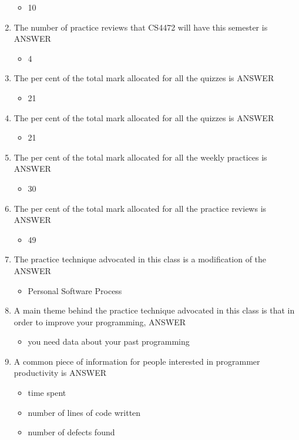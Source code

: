 \documentclass{exam}
\begin{document}
\begin{enumerate}
\begin{itemize}
\item 10
\end{itemize}
\item The number of practice reviews that CS4472 will have this semester is ANSWER
\begin{itemize}
\item 4
\end{itemize}
\item The per cent of the total mark allocated for all the quizzes is ANSWER
\begin{itemize}
\item 21
\end{itemize}
\item The per cent of the total mark allocated for all the quizzes is ANSWER
\begin{itemize}
\item 21
\end{itemize}
\item The per cent of the total mark allocated for all the weekly practices is ANSWER
\begin{itemize}
\item 30
\end{itemize}
\item The per cent of the total mark allocated for all the practice reviews is ANSWER
\begin{itemize}
\item 49
\end{itemize}
\item The practice technique advocated in this class is a modification of the ANSWER
\begin{itemize}
\item Personal Software Process
\end{itemize}
\item A main theme behind the practice technique advocated in this class is that in order to improve your programming, ANSWER
\begin{itemize}
\item you need data about your past programming
\end{itemize}
\item A common piece of information for people interested in programmer productivity is ANSWER
\begin{itemize}
\item time spent
\item number of lines of code written
\item number of defects found
\end{itemize}

\end{enumerate}
\end{document}

